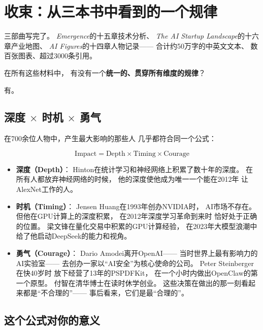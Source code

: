 \section{收束：从三本书中看到的一个规律}
\label{sec:fg-closing}

三部曲写完了。
\textit{Emergence}的十五章技术分析、
\textit{The AI Startup Landscape}的十六章产业地图、
\textit{AI Figures}的十四章人物记录——
合计约50万字的中英文文本、
数百张图表、超过3000条引用。

在所有这些材料中，
有没有一个\textbf{统一的、贯穿所有维度的规律}？

有。

\subsection{深度 $\times$ 时机 $\times$ 勇气}

在700余位人物中，产生最大影响的那些人
几乎都符合同一个公式：

$$\text{Impact} = \text{Depth} \times \text{Timing} \times \text{Courage}$$

\begin{itemize}
  \item \textbf{深度（Depth）}：
    Hinton在统计学习和神经网络上积累了数十年的深度。
    在所有人都放弃神经网络的时候，
    他的深度使他成为唯一一个能在2012年
    让AlexNet工作的人。

  \item \textbf{时机（Timing）}：
    Jensen Huang在1993年创办NVIDIA时，
    AI市场不存在。但他在GPU计算上的深度积累，
    在2012年深度学习革命到来时
    恰好处于正确的位置。
    梁文锋在量化交易中积累的GPU计算经验，
    在2023年大模型浪潮中
    给了他启动DeepSeek的能力和视角。

  \item \textbf{勇气（Courage）}：
    Dario Amodei离开OpenAI——
    当时世界上最有影响力的AI实验室——
    去创办一家以``AI安全''为核心使命的公司。
    Peter Steinberger在快40岁时
    放下经营了13年的PSPDFKit，
    在一个小时内做出OpenClaw的第一个原型。
    付智在清华博士在读时休学创业。
    这些决策在做出的那一刻看起来都是``不合理的''——
    事后看来，它们是最``合理的''。
\end{itemize}

\subsection{这个公式对你的意义}

